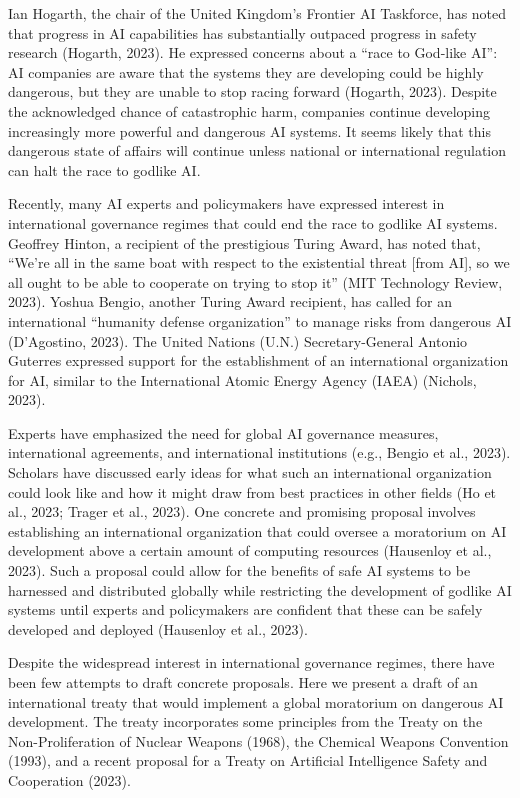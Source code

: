 \documentclass[12pt,a4paper]{article}
\begin{document}
Ian Hogarth, the chair of the United Kingdom’s Frontier AI Taskforce, has noted that progress in AI capabilities has substantially outpaced progress in safety research (Hogarth, 2023). He expressed concerns about a “race to God-like AI”: AI companies are aware that the systems they are developing could be highly dangerous, but they are unable to stop racing forward (Hogarth, 2023). Despite the acknowledged chance of catastrophic harm, companies continue developing increasingly more powerful and dangerous AI systems. It seems likely that this dangerous state of affairs will continue unless national or international regulation can halt the race to godlike AI. 

Recently, many AI experts and policymakers have expressed interest in international governance regimes that could end the race to godlike AI systems. Geoffrey Hinton, a recipient of the prestigious Turing Award, has noted that, “We're all in the same boat with respect to the existential threat [from AI], so we all ought to be able to cooperate on trying to stop it” (MIT Technology Review, 2023). Yoshua Bengio, another Turing Award recipient, has called for an international “humanity defense organization” to manage risks from dangerous AI (D’Agostino, 2023). The United Nations (U.N.) Secretary-General Antonio Guterres expressed support for the establishment of an international organization for AI, similar to the International Atomic Energy Agency (IAEA) (Nichols, 2023). 

Experts have emphasized the need for global AI governance measures, international agreements, and international institutions (e.g., Bengio et al., 2023). Scholars have discussed early ideas for what such an international organization could look like and how it might draw from best practices in other fields (Ho et al., 2023; Trager et al., 2023). One concrete and promising proposal involves establishing an international organization that could oversee a moratorium on AI development above a certain amount of computing resources (Hausenloy et al., 2023). Such a proposal could allow for the benefits of safe AI systems to be harnessed and distributed globally while restricting the development of godlike AI systems until experts and policymakers are confident that these can be safely developed and deployed (Hausenloy et al., 2023). 

Despite the widespread interest in international governance regimes, there have been few attempts to draft concrete proposals. Here we present a draft of an international treaty that would implement a global moratorium on dangerous AI development. The treaty incorporates some principles from the Treaty on the Non-Proliferation of Nuclear Weapons (1968), the Chemical Weapons Convention (1993), and a recent proposal for a Treaty on Artificial Intelligence Safety and Cooperation (2023). 
\end{document}
